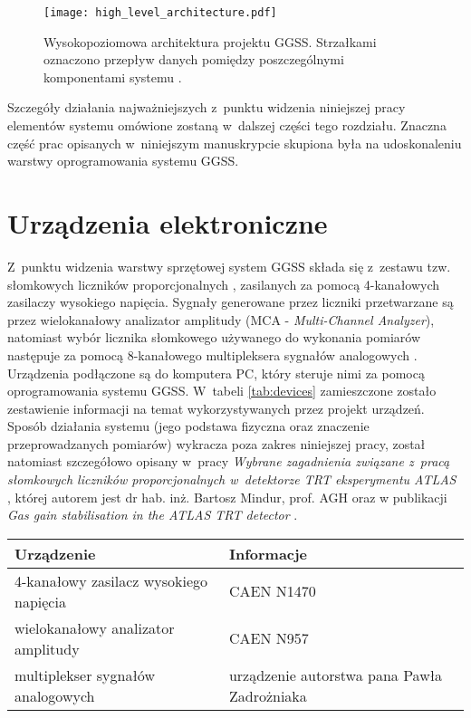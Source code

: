 \begin{figure}[H]
\centering
\texttt{[image: high\_level\_architecture.pdf]}
\caption{Wysokopoziomowa architektura projektu GGSS. Strzałkami oznaczono przepływ danych pomiędzy poszczególnymi komponentami systemu \cite{GGSS_inz}.}
\label{fig:high_level_architecture}
\end{figure}


Szczegóły działania najważniejszych z~punktu widzenia niniejszej pracy elementów systemu omówione zostaną w~dalszej części tego rozdziału. Znaczna część prac opisanych w~niniejszym manuskrypcie skupiona była na udoskonaleniu warstwy oprogramowania systemu GGSS.


\section{Urządzenia elektroniczne}
Z~punktu widzenia warstwy sprzętowej system GGSS składa się z~zestawu tzw. słomkowych liczników proporcjonalnych \cite{mindur_phd} \cite{GGSS_jinst}, zasilanych za pomocą 4-kanałowych zasilaczy wysokiego napięcia. Sygnały generowane przez liczniki przetwarzane są przez wielokanałowy analizator amplitudy (MCA - \emph{Multi-Channel Analyzer}), natomiast wybór licznika słomkowego używanego do wykonania pomiarów następuje za pomocą 8-kanałowego multipleksera sygnałów analogowych \cite{ZadrozniakInz} \cite{ZadrozniakMgr}. Urządzenia podłączone są do komputera PC, który steruje nimi za pomocą oprogramowania systemu GGSS. W~tabeli \ref{tab:devices} zamieszczone zostało zestawienie informacji na temat wykorzystywanych przez projekt urządzeń. Sposób działania systemu (jego podstawa fizyczna oraz znaczenie przeprowadzanych pomiarów) wykracza poza zakres niniejszej pracy, został natomiast szczegółowo opisany w~pracy \emph{Wybrane zagadnienia związane z~pracą słomkowych liczników proporcjonalnych w~detektorze TRT eksperymentu ATLAS} \cite{mindur_phd}, której autorem jest dr hab. inż. Bartosz Mindur, prof. AGH oraz w publikacji \emph{Gas gain stabilisation in the ATLAS TRT detector} \cite{GGSS_jinst}.

\clearpage

\begin{table*}[htbp]
\centering
\caption{Zestawienie istotnych z~punktu widzenia niniejszej pracy urządzeń wchodzących w~skład systemu GGSS.}
\label{tab:devices}
\begin{tabularx}{\textwidth}{@{}lX@{}}
\toprule
Urządzenie &
Informacje \\
\midrule
4-kanałowy zasilacz wysokiego napięcia & CAEN N1470 \cite{caen_n1470} \\
wielokanałowy analizator amplitudy & CAEN N957 \cite{caen_n957} \\
multiplekser sygnałów analogowych & urządzenie autorstwa pana Pawła Zadrożniaka \cite{ZadrozniakInz}\\
\bottomrule
\end{tabularx}
\end{table*}


